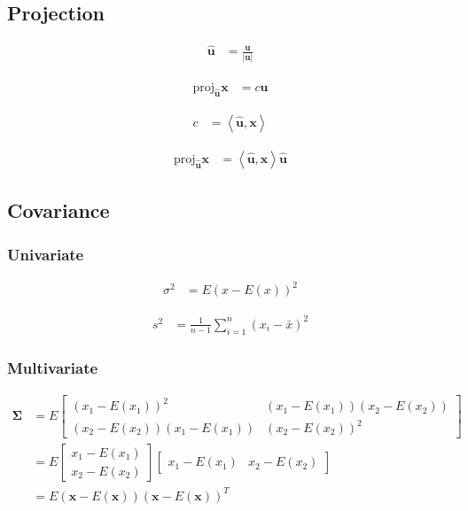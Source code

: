 \documentclass{article}
\begin{document}
\subsection{Projection}

\begin{align}
	\hat{\mathbf{u}} & =\frac{\mathbf{u}}{\left|\mathbf{u}\right|}
\end{align}

\begin{align}
	\textrm{proj}_{\hat{\mathbf{u}}}\mathbf{x} & =c\hat{\mathbf{u}}
\end{align}

\begin{align}
	c & =\left\langle \hat{\mathbf{u}},\mathbf{x}\right\rangle 
\end{align}

\begin{align}
	\textrm{proj}_{\hat{\mathbf{u}}}\mathbf{x} & =\left\langle \hat{\mathbf{u}},\mathbf{x}\right\rangle \hat{\mathbf{u}}
\end{align}

\subsection{Covariance}

\subsubsection{Univariate}

\begin{align}
	\sigma^{2} & =E\left(x-E\left(x\right)\right)^{2}
\end{align}

\begin{align}
	s^{2} & =\frac{1}{n-1}\sum_{i=1}^{n}\left(x_{i}-\bar{x}\right)^{2}
\end{align}

\subsubsection{Multivariate}

\begin{align}
	\mathbf{\Sigma} & =E\left[\begin{array}{cc}
		\left(x_{1}-E\left(x_{1}\right)\right)^{2} & \left(x_{1}-E\left(x_{1}\right)\right)\left(x_{2}-E\left(x_{2}\right)\right)\\
		\left(x_{2}-E\left(x_{2}\right)\right)\left(x_{1}-E\left(x_{1}\right)\right) & \left(x_{2}-E\left(x_{2}\right)\right)^{2}
	\end{array}\right]\\
	& =E\left[\begin{array}{c}
		x_{1}-E\left(x_{1}\right)\\
		x_{2}-E\left(x_{2}\right)
	\end{array}\right]\left[\begin{array}{cc}
		x_{1}-E\left(x_{1}\right) & x_{2}-E\left(x_{2}\right)\end{array}\right]\\
	& =E\left(\mathbf{x}-E\left(\mathbf{x}\right)\right)\left(\mathbf{x}-E\left(\mathbf{x}\right)\right)^{T}
\end{align}
\end{document}
